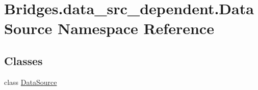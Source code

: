 \hypertarget{namespace_bridges_1_1data__src__dependent_1_1_data_source}{}\section{Bridges.\+data\+\_\+src\+\_\+dependent.\+Data\+Source Namespace Reference}
\label{namespace_bridges_1_1data__src__dependent_1_1_data_source}
\subsection*{Classes}
\begin{DoxyCompactItemize}
\item 
class \hyperlink{class_bridges_1_1data__src__dependent_1_1_data_source_1_1_data_source}{Data\+Source}
\end{DoxyCompactItemize}

